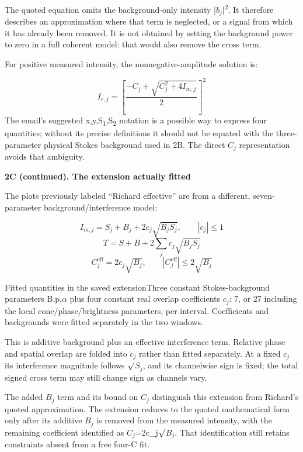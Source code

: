 \documentclass[10pt,a4paper]{article}
\newcommand{\heading}[1]{{\sffamily\Large\bfseries\color{ink}#1}\par\vspace{7pt}}
\begin{document}
The quoted equation omits the background-only intensity |\(b_{j}\)|\textsuperscript{2}. It therefore describes an approximation where that term is neglected, or a signal from which it has already been removed. It is not obtained by setting the background power to zero in a full coherent model: that would also remove the cross term.\par
For positive measured intensity, the nonnegative-amplitude solution is:\par
\begin{equation*}I_{r,j}=\left[\frac{-C_j+\sqrt{C_j^2+4I_{m,j}}}{2}\right]^2\end{equation*}
The email’s suggested x,y,S\textsubscript{1},S\textsubscript{2} notation is a possible way to express four quantities; without its precise definitions it should not be equated with the three-parameter physical Stokes background used in 2B. The direct \(C_{j}\) representation avoids that ambiguity.\par
\clearpage
\heading{2C (continued). The extension actually fitted}
The plots previously labeled “Richard effective” are from a different, seven-parameter background/interference model:\par
\begin{equation*}I_{m,j}=S_j+B_j+2c_j\sqrt{B_jS_j},\qquad |c_j|\leq1\end{equation*}
\begin{equation*}T=S+B+2\sum_j c_j\sqrt{B_jS_j}\end{equation*}
\begin{equation*}C_j^{\mathrm{eff}}=2c_j\sqrt{B_j},\qquad |C_j^{\mathrm{eff}}|\leq2\sqrt{B_j}\end{equation*}
\begin{fitbox}{Fitted quantities in the saved extension}Three constant Stokes-background parameters B,p,\(α\) plus four constant real overlap coefficients \(c_{j}\): 7, or 27 including the local cone/phase/brightness parameters, per interval. Coefficients and backgrounds were fitted separately in the two windows.\end{fitbox}
This is additive background plus an effective interference term. Relative phase and spatial overlap are folded into \(c_{j}\) rather than fitted separately. At a fixed \(c_{j}\) its interference magnitude follows \(\surd\)\(S_{j}\), and its channelwise sign is fixed; the total signed cross term may still change sign as channels vary.\par
The added \(B_{j}\) term and its bound on \(C_{j}\) distinguish this extension from Richard’s quoted approximation. The extension reduces to the quoted mathematical form only after its additive \(B_{j}\) is removed from the measured intensity, with the remaining coefficient identified as \(C_{j}\)=2c\_j\(\surd\)\(B_{j}\). That identification still retains constraints absent from a free four-C fit.\par
\end{document}
